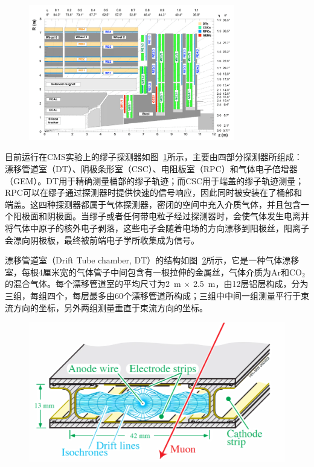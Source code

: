 \begin{figure}[!htbp]
    \centering
    \includegraphics[width=0.8\textwidth]{figures/chapter02/Quadrant-of-the-CMS-detector-showing-the-present-muon-system-including-RPCs-DTs-and.png}
    \label{fig:c02f08}
\end{figure}

目前运行在CMS实验上的缪子探测器如图~\ref{fig:c02f08}所示，主要由四部分探测器所组成：漂移管道室（DT）、阴极条形室（CSC）、电阻板室（RPC）和气体电子倍增器（GEM）。DT用于精确测量桶部的缪子轨迹；而CSC用于端盖的缪子轨迹测量；RPC可以在缪子通过探测器时提供快速的信号响应，因此同时被安装在了桶部和端盖。这四种探测器都属于气体探测器，密闭的空间中充入介质气体，并且包含一个阳极面和阴极面。当缪子或者任何带电粒子经过探测器时，会使气体发生电离并将气体中原子的核外电子剥落，这些电子会随着电场的方向漂移到阳极丝，阳离子会漂向阴极板，最终被前端电子学所收集成为信号。

漂移管道室（Drift Tube chamber, DT）的结构如图~\ref{fig:c02f09}所示，它是一种气体漂移室，每根4厘米宽的气体管子中间包含有一根拉伸的金属丝，气体介质为Ar和CO$_2$的混合气体。每个漂移管道室的平均尺寸为2~\si{m} $\times$ 2.5~\si{m}，由12层铝层构成，分为三组，每组四个，每层最多由60个漂移管道所构成；三组中中间一组测量平行于束流方向的坐标，另外两组测量垂直于束流方向的坐标。

\begin{figure}[!htbp]
    \centering
    \includegraphics[width=1.0\textwidth]{Thesis (Version 2246)/figures/chapter02/DT.png}
    \label{fig:c02f09}
\end{figure}

